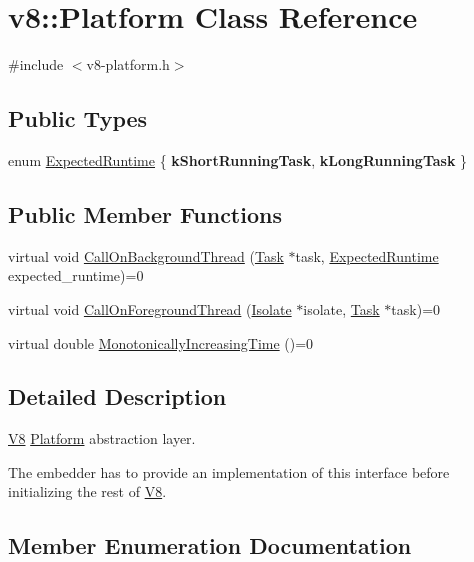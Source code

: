 \hypertarget{classv8_1_1_platform}{}\section{v8\+:\+:Platform Class Reference}
\label{classv8_1_1_platform}


{\ttfamily \#include $<$v8-\/platform.\+h$>$}

\subsection*{Public Types}
\begin{DoxyCompactItemize}
\item 
enum \hyperlink{classv8_1_1_platform_ace7f666b2b5995bb0e898e12fa660718}{Expected\+Runtime} \{ {\bfseries k\+Short\+Running\+Task}, 
{\bfseries k\+Long\+Running\+Task}
 \}
\end{DoxyCompactItemize}
\subsection*{Public Member Functions}
\begin{DoxyCompactItemize}
\item 
virtual void \hyperlink{classv8_1_1_platform_aa715e6839c1954b4e23b9d2df00bd3ea}{Call\+On\+Background\+Thread} (\hyperlink{classv8_1_1_task}{Task} $\ast$task, \hyperlink{classv8_1_1_platform_ace7f666b2b5995bb0e898e12fa660718}{Expected\+Runtime} expected\+\_\+runtime)=0
\item 
virtual void \hyperlink{classv8_1_1_platform_a8fa13959f919d1d3ff170bceea939915}{Call\+On\+Foreground\+Thread} (\hyperlink{classv8_1_1_isolate}{Isolate} $\ast$isolate, \hyperlink{classv8_1_1_task}{Task} $\ast$task)=0
\item 
virtual double \hyperlink{classv8_1_1_platform_a6d4d7c2dcf6b0c7113099b97fa7f57b7}{Monotonically\+Increasing\+Time} ()=0
\end{DoxyCompactItemize}


\subsection{Detailed Description}
\hyperlink{classv8_1_1_v8}{V8} \hyperlink{classv8_1_1_platform}{Platform} abstraction layer.

The embedder has to provide an implementation of this interface before initializing the rest of \hyperlink{classv8_1_1_v8}{V8}. 

\subsection{Member Enumeration Documentation}
\hypertarget{classv8_1_1_platform_ace7f666b2b5995bb0e898e12fa660718}{}
